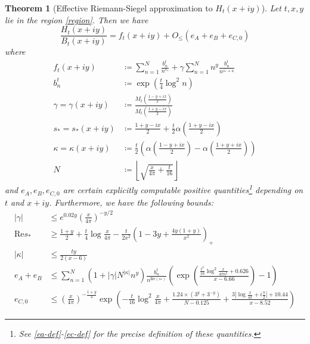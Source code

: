\documentclass[a4paper,11pt,twoside]{amsart}
\newtheorem{theorem}{Theorem}[section]
\begin{document}
\begin{theorem}[Effective Riemann-Siegel approximation to $H_t(x+iy)$]\label{eff}  Let $t,x,y$ lie in the region \eqref{region}.  Then we have
\begin{equation}\label{ratio-form-eff}
\frac{H_t(x+iy)}{B_t(x+iy)} = f_t(x+iy) + O_{\leq}\left( e_A + e_B + e_{C,0} \right)
\end{equation}
where
\begin{align}
f_t(x+iy) &\coloneqq \sum_{n=1}^N \frac{b_n^t}{n^{s_*}} + \gamma \sum_{n=1}^N n^y \frac{b_n^t}{n^{\overline{s_*} + \kappa}}\label{ft-def} \\
b_n^t &\coloneqq \exp( \frac{t}{4} \log^2 n ) \label{bn-def}\\
\gamma = \gamma(x+iy) &\coloneqq \frac{M_t\left(\frac{1-y+ix}{2}\right)}{M_t\left(\frac{1+y-ix}{2}\right)} \label{lambda-def} \\
s_* = s_*(x+iy) &\coloneqq \frac{1+y-ix}{2} +\frac{t}{2} \alpha\left(\frac{1+y-ix}{2}\right) \label{sn-def}\\
\kappa = \kappa(x+iy) &\coloneqq \frac{t}{2} \left(\alpha\left(\frac{1-y+ix}{2}\right) - \alpha\left(\frac{1+y+ix}{2}\right)\right) \label{kappa-def}\\
N &\coloneqq \left\lfloor \sqrt{\frac{x}{4\pi} + \frac{t}{16}} \right\rfloor \label{N-def-main} 
\end{align}
and $e_A, e_B, e_{C,0}$ are certain explicitly computable positive quantities\footnote{See \eqref{ea-def}-\eqref{ec-def} for the precise definition of these quantities.} depending on $t$ and $x+iy$.  Furthermore, we have the following bounds:
\begin{align}
|\gamma| &\leq e^{0.02 y} \left( \frac{x}{4\pi} \right)^{-y/2}  \label{gamma-bound} \\
\mathrm{Re} s_* &\geq \frac{1+y}{2} +\frac{t}{4} \log \frac{x}{4\pi} - \frac{t}{2x^2} \left(1-3y+\frac{4y(1+y)}{x^2}\right)_+  \label{res-bound} \\
|\kappa| &\leq  \frac{ty}{2(x-6)} \label{kappa-bound} \\
e_A + e_B &\leq \sum_{n=1}^N (1 + |\gamma| N^{|\kappa|} n^y) \frac{b_n^t}{n^{\mathrm{Re}(s_*)}} \left( \exp\left( \frac{\frac{t^2}{16} \log^2 \frac{x}{4\pi n^2} + 0.626}{x-6.66} \right)-1 \right) \label{eab-bound} \\
e_{C,0} &\leq \left(\frac{x}{4\pi}\right)^{-\frac{1+y}{4}} \exp\left( - \frac{t}{16} \log^2 \frac{x}{4\pi} + \frac{1.24 \times (3^y+3^{-y})}{N-0.125} + \frac{3 |\log \frac{x}{4\pi} + i \frac{\pi}{2}|+10.44}{x-8.52} \right) \label{ec-bound}
\end{align}
\end{theorem}
\end{document}
